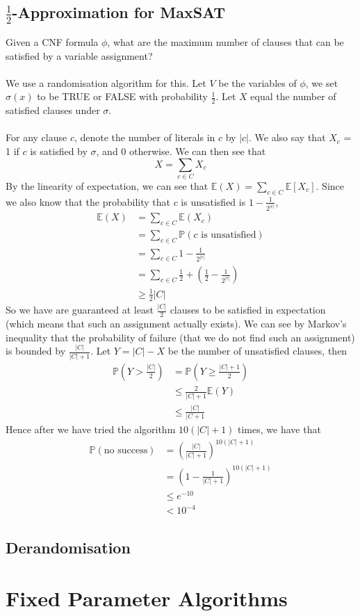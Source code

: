 \documentclass{article}
\theoremstyle{plain}
\theoremstyle{definition}
\begin{document}
    \subsection{$\frac{1}{2}$-Approximation for MaxSAT}
    Given a CNF formula $\phi$, what are the maximum number of clauses that can be satisfied by a variable assignment? \\ \\
    We use a randomisation algorithm for this. Let $V$ be the variables of $\phi$, we set $\sigma(x)$ to be TRUE or FALSE with probability $\frac{1}{2}$. Let $X$ equal the number of satisfied clauses under $\sigma$. \\ \\
    For any clause $c$, denote the number of literals in $c$ by $|c|$. We also say that $X_c$ = 1 if $c$ is satisfied by $\sigma$, and 0 otherwise. We can then see that 
    \[ X = \sum_{c \in C} X_c \]
    By the linearity of expectation, we can see that $\mathbb{E}(X) = \sum_{c \in C} \mathbb{E}[X_c]$. Since we also know that the probability that $c$ is unsatisfied is $1- \frac{1}{2^{|c|}}$,
    \begin{align*}
        \mathbb{E}(X) &= \sum_{c \in C} \mathbb{E}(X_c) \\
                      &= \sum_{c \in C} \mathbb{P}(\text{$c$ is unsatisfied}) \\
                      &= \sum_{c \in C} 1 - \frac{1}{2^{|c|}} \\ 
                      &= \sum_{c \in C} \frac{1}{2} + (\frac{1}{2} - \frac{1}{2^{|c|}}) \\ 
                      &\geq \frac{1}{2}|C|
    \end{align*}
    So we have are guaranteed at least $\frac{|C|}{2}$ clauses to be satisfied in expectation (which means that such an assignment actually exists). We can see by Markov's inequality that the probability of failure (that we do not find such an assignment) is bounded by $\frac{|C|}{|C|+1}$. Let $Y = |C| - X$ be the number of unsatisfied clauses, then
    \begin{align*}
        \mathbb{P}(Y > \frac{|C|}{2}) &= \mathbb{P}(Y \geq \frac{|C|+1}{2}) \\
        &\leq \frac{2}{|C|+1}\mathbb{E}(Y) \\
        &\leq \frac{|C|}{|C+1}
    \end{align*}
    Hence after we have tried the algorithm $10(|C|+1)$ times, we have that
    \begin{align*}
        \mathbb{P}(\text{no success}) &= (\frac{|C|}{|C|+1})^{10(|C|+1)} \\ 
        &= (1 - \frac{1}{|C|+1})^{10(|C|+1)} \\ 
        &\leq e^{-10} \\
        &< 10^{-4}
    \end{align*}

    \subsection{Derandomisation}
        
    
    \section{Fixed Parameter Algorithms}
\end{document}
